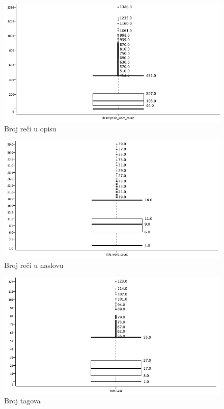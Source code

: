 \documentclass[a4paper]{article}
\theoremstyle{definition}
\begin{document}

\begin{figure}[H]
\begin{center}
    \includegraphics[width=1\textwidth]{box_desc_word_count.png}
    \caption{Broj reči u opisu}
    \label{fig:boxDesc}
\end{center}
\end{figure}

\begin{figure}[H]
\begin{center}
    \includegraphics[width=1\textwidth]{box_title_word_count.png}
    \caption{Broj reči u naslovu}
\end{center}
\end{figure}

\begin{figure}[H]
\begin{center}
    \includegraphics[width=1\textwidth]{box_num-tag.png}
    \caption{Broj tagova}
\end{center}
\end{figure}
\end{document}
